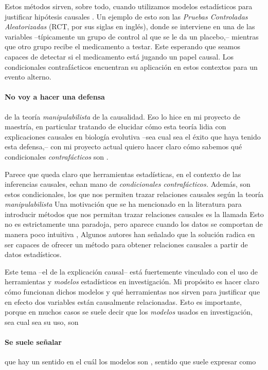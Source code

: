 Estos métodos sirven, sobre todo, cuando utilizamos modelos estadísticos para justificar hipótesis causales \parencite{Pearl2016, Pearl2018}.
Un ejemplo de esto son las \emph{Pruebas Controladas Aleatorizadas} (RCT, por sus siglas en inglés), donde se interviene en una de las variables --típicamente un grupo de control al que se le da un placebo,-- mientras que otro grupo recibe el medicamento a testar.
Este esperando que seamos capaces de detectar si el medicamento está jugando un papel causal. 
Los condicionales contrafácticos encuentran su aplicación en estos contextos para  un evento alterno.

\paragraph{No voy a hacer una defensa} de la teoría \emph{manipulabilista} de la causalidad. 
Eso lo hice en mi proyecto de maestría, en particular tratando de elucidar cómo esta teoría lidia con explicaciones causales en biología evolutiva --sea cual sea el éxito que haya tenido esta defensa,-- con
mi proyecto actual quiero hacer claro cómo sabemos qué condicionales \emph{contrafácticos} son .

Parece que queda claro que herramientas estadísticas, en el contexto de las inferencias causales, echan mano de \emph{condicionales contrafácticos.}
Además, son estos condicionales, los que nos permiten trazar relaciones causales según la teoría \emph{manipulabilista}
Una motivación que se ha mencionado en la literatura para introducir métodos que nos permitan trazar relaciones causales es la llamada 
Esto no es estrictamente una paradoja, pero aparece cuando los datos se comportan de manera poco intuitiva \parencite[p.~13]{Hajek2016-HAJOHO}, 
Algunos autores han señalado que la solución radica en ser capaces de ofrecer un método para obtener relaciones causales a partir de datos estadísticos.

Este tema --el de la explicación causal-- está fuertemente vinculado con el uso de herramientas y \emph{modelos} estadísticos en investigación.
Mi propósito es hacer claro cómo funcionan dichos modelos y qué herramientas nos sirven para justificar que en efecto dos variables están causalmente relacionadas.
Esto es importante, porque en muchos casos se suele decir que los \emph{modelos} usados en investigación, sea cual sea su uso, son  

\paragraph{Se suele señalar} que hay un sentido en el cuál los modelos son , sentido que suele expresar como  \parencite[p.~18, énfasis agregado]{Potochnik2017-POTIAT-3}

